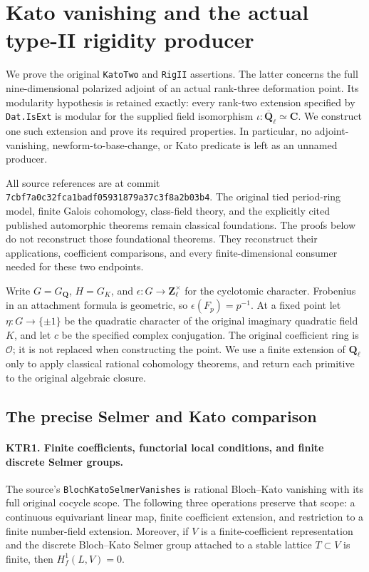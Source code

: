 \section{Kato vanishing and the actual type-II rigidity producer}
\label{sec:type-ii-rigidity-v47}

We prove the original \texttt{KatoTwo} and \texttt{RigII} assertions.
The latter concerns the full nine-dimensional polarized adjoint of an
actual rank-three deformation point.  Its modularity hypothesis is
retained exactly: every rank-two extension specified by
\texttt{Dat.IsExt} is modular for the supplied field isomorphism
\(\iota:\overline{\mathbf Q}_\ell\simeq\mathbf C\).
We construct one such extension and prove its required properties.
In particular, no adjoint-vanishing, newform-to-base-change, or Kato
predicate is left as an unnamed producer.

All source references are at commit
\texttt{7cbf7a0c32fca1badf05931879a37c3f8a2b03b4}.
The original tied period-ring model, finite Galois cohomology,
class-field theory, and the explicitly cited published automorphic
theorems remain classical foundations.  The proofs below do not
reconstruct those foundational theorems.  They reconstruct their
applications, coefficient comparisons, and every finite-dimensional
consumer needed for these two endpoints.

Write \(G=G_{\mathbf Q}\), \(H=G_K\), and
\(\epsilon:G\to\mathbf Z_\ell^\times\) for the cyclotomic
character.  Frobenius in an attachment formula is geometric, so
\(\epsilon(F_p)=p^{-1}\).  At a fixed point let
\(\eta:G\to\{\pm1\}\) be the quadratic character of the
original imaginary quadratic field \(K\), and let \(c\) be the
specified complex conjugation.  The original coefficient ring is
\(\mathcal O\); it is not replaced when constructing the point.
We use a finite extension of \(\mathbf Q_\ell\) only to apply
classical rational cohomology theorems, and return each primitive
to the original algebraic closure.

\subsection{The precise Selmer and Kato comparison}

\paragraph{KTR1. Finite coefficients, functorial local conditions, and finite discrete Selmer groups.}
\label{claim:KTR1}
The source's \texttt{BlochKatoSelmerVanishes} is rational
Bloch--Kato vanishing with its full original cocycle scope.  The
following three operations preserve that scope: a continuous
equivariant linear map, finite coefficient extension, and restriction
to a finite number-field extension.  Moreover, if \(V\) is a
finite-coefficient representation and the discrete Bloch--Kato
Selmer group attached to a stable lattice \(T\subset V\) is
finite, then \(H^1_f(L,V)=0\).

